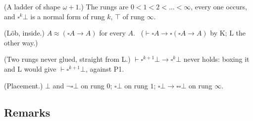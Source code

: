 \begin{lines}
\item[\lab{T1}] (A ladder of shape $\omega + 1$.) The rungs are $0 < 1 < 2 < \dots < \infty$, every one occurs, and $\square^k\bot$ is a normal form of rung $k$, $\top$ of rung $\infty$.
\item[\lab{T2}] (L\"ob, inside.) $A \approx (\square A \to A)$ for every $A$. \ ($\vdash \square A \to \square(\square A \to A)$ by K; L the other way.)
\item[\lab{T3}] (Two rungs never glued, straight from L.) $\vdash \square^{k+1}\bot \to \square^k\bot$ never holds: boxing it and L would give $\vdash \square^{k+1}\bot$, against P1.
\item[\lab{T4}] (Placement.) $\bot$ and $\neg\square\bot$ on rung $0$; $\square\bot$ on rung $1$; $\square\bot \to \square\square\bot$ on rung $\infty$.
\end{lines}

\subsection*{Remarks}

